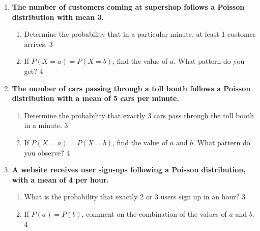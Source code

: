 \documentclass[a4paper,oneside]{book}
\begin{document}
\begin{enumerate}
  \begin{enumerate}
    \item
	When is Poisson variate applicable? \hfill 1
    \item
	Show conversion criteria and method from Binomial to Poisson distribution. \hfill 2
    \item  
	Find the probability of receiving no more than 3 calls. \hfill 3
    \item
	Find the pattern of calls and show on graph paper.  \hfill 4 \\
	Hint: Find probabilities: P(0), P(1), $\cdots$
  \end{enumerate}
  
   \item
	  \textbf{The number of customers coming at supershop follows a Poisson 
	  distribution with mean 3.} 
  
  \begin{enumerate}
    \item  
	Determine the probability that in a particular minute, at least 1 customer 
	arrives. \hfill 3
    \item
	If $P(X = a) = P(X= b)$, find the value of $a$. What pattern do you get?
	\hfill 4
  \end{enumerate}
  
  \item
	  \textbf{The number of cars passing through a toll booth follows a 
	  Poisson distribution with a mean of 5 cars per minute.} 
  
  \begin{enumerate}
    \item  
	Determine the probability that exactly 3 cars pass through the toll 
	booth in a minute. \hfill 3
    \item
	If $P(X = a) = P(X = b)$, find the value of $a$ and $b$. What pattern do 
	you observe? \hfill 4
  \end{enumerate}
  
  \item
  \textbf{A website receives user sign-ups following a Poisson distribution, with a mean of 4 per hour.}  
  
  \begin{enumerate}
    \item  
      What is the probability that exactly 2 or 3 users sign up in an hour? \hfill 3  
    \item  
      If $P(a) = P(b)$, comment on the combination of the values of $a$ and $b$. \hfill 4  
  \end{enumerate}



\end{enumerate}
\end{document}

